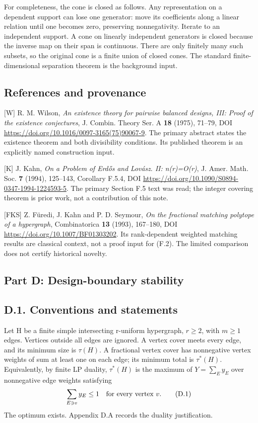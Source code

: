 \documentclass[
  11pt,
]{article}
\begin{document}
For completeness, the cone is closed as follows. Any representation on a
dependent support can lose one generator: move its coefficients along a
linear relation until one becomes zero, preserving nonnegativity.
Iterate to an independent support. A cone on linearly independent
generators is closed because the inverse map on their span is
continuous. There are only finitely many such subsets, so the original
cone is a finite union of closed cones. The standard finite-dimensional
separation theorem is the background input.

\subsection{References and provenance}\label{references-and-provenance}

{[}W{]} R. M. Wilson, \emph{An existence theory for pairwise balanced
designs, III: Proof of the existence conjectures}, J. Combin. Theory
Ser. A \textbf{18} (1975), 71--79, DOI
\url{https://doi.org/10.1016/0097-3165(75)90067-9}. The primary abstract
states the existence theorem and both divisibility conditions. Its
published theorem is an explicitly named construction input.

{[}K{]} J. Kahn, \emph{On a Problem of Erdős and Lovász. II: n(r)=O(r)},
J. Amer. Math. Soc. \textbf{7} (1994), 125--143, Corollary F.5.4, DOI
\url{https://doi.org/10.1090/S0894-0347-1994-1224593-5}. The primary
Section F.5 text was read; the integer covering theorem is prior work,
not a contribution of this note.

{[}FKS{]} Z. Füredi, J. Kahn and P. D. Seymour, \emph{On the fractional
matching polytope of a hypergraph}, Combinatorica \textbf{13} (1993),
167--180, DOI \url{https://doi.org/10.1007/BF01303202}. Its
rank-dependent weighted matching results are classical context, not a
proof input for (F.2). The limited comparison does not certify
historical novelty.

\subsection{Part D: Design-boundary
stability}\label{part-d-design-boundary-stability}

\subsection{D.1. Conventions and
statements}\label{d.1.-conventions-and-statements}

Let H be a finite simple intersecting r-uniform hypergraph, \(r\ge2\),
with \(m\ge1\) edges. Vertices outside all edges are ignored. A vertex
cover meets every edge, and its minimum size is \(\tau(H)\). A
fractional vertex cover has nonnegative vertex weights of sum at least
one on each edge; its minimum total is \(\tau^*(H)\). Equivalently, by
finite LP duality, \(\tau^*(H)\) is the maximum of \(Y=\sum_E y_E\) over
nonnegative edge weights satisfying \[
                       \sum_{E\ni v}y_E\le1
                       \quad\hbox{for every vertex }v.       \tag{D.1}
\] The optimum exists. Appendix D.A records the duality justification.
\end{document}
